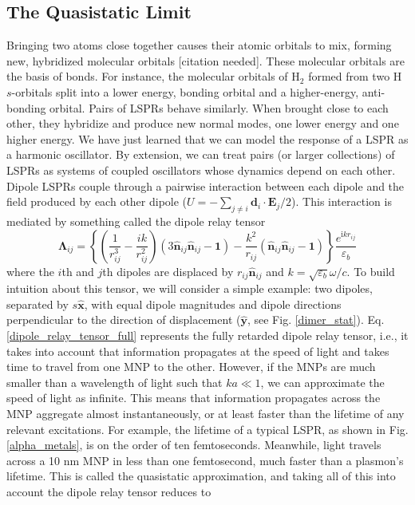 \documentclass [11pt, proquest] {uwthesis}[2016/11/22]
\begin{document}
\subsection{The Quasistatic Limit}
Bringing two atoms close together causes their atomic orbitals to mix, forming new, hybridized molecular orbitals [citation needed]. These molecular orbitals are the basis of bonds. For instance, the molecular orbitals of $\textrm{H}_2$ formed from two H $s$-orbitals split into a lower energy, bonding orbital and a higher-energy, anti-bonding orbital. Pairs of LSPRs behave similarly. When brought close to each other, they hybridize and produce new normal modes, one lower energy and one higher energy. We have just learned that we can model the response of a LSPR as a harmonic oscillator. By extension, we can treat pairs (or larger collections) of LSPRs as systems of coupled oscillators whose dynamics depend on each other. Dipole LSPRs couple through a pairwise interaction between each dipole and the field produced by each other dipole ($U = -\sum_{j\neq i}\textbf{d}_i\cdot\textbf{E}_j/2$). This interaction is mediated by something called the dipole relay tensor
\begin{equation}
\boldsymbol{\Lambda}_{ij} = \left\{\left(\frac{1}{r_{ij}^3} - \frac{ik}{r_{ij}^2}\right)\left(3\hat{\textbf{n}}_{ij}\hat{\textbf{n}}_{ij} - \textbf{1}\right) - \frac{k^2}{r_{ij}}\left(\hat{\textbf{n}}_{ij}\hat{\textbf{n}}_{ij} - \textbf{1}\right)\right\}\frac{e^{\textrm{i}kr_{ij}}}{\varepsilon_b}
\label{dipole_relay_tensor_full}
\end{equation}
where the $i$th and $j$th dipoles are displaced by $r_{ij}\hat{\textbf{n}}_{ij}$ and $k=\sqrt{\varepsilon_b}\omega/c$. To build intuition about this tensor, we will consider a simple example: two dipoles, separated by $s\hat{\textbf{x}}$, with equal dipole magnitudes and dipole directions perpendicular to the direction of displacement ($\hat{\textbf{y}}$, see Fig. \ref{dimer_stat}). Eq. \ref{dipole_relay_tensor_full} represents the fully retarded dipole relay tensor, i.e., it takes into account that information propagates at the speed of light and takes time to travel from one MNP to the other. However, if the MNPs are much smaller than a wavelength of light such that $ka \ll 1$, we can approximate the speed of light as infinite. This means that information propagates across the MNP aggregate almost instantaneously, or at least faster than the lifetime of any relevant excitations. For example, the lifetime of a typical LSPR, as shown in Fig. \ref{alpha_metals}, is on the order of ten femtoseconds. Meanwhile, light travels across a 10 nm MNP in less than one femtosecond, much faster than a plasmon's lifetime. This is called the quasistatic approximation, and taking all of this into account the dipole relay tensor reduces to
\end{document}
